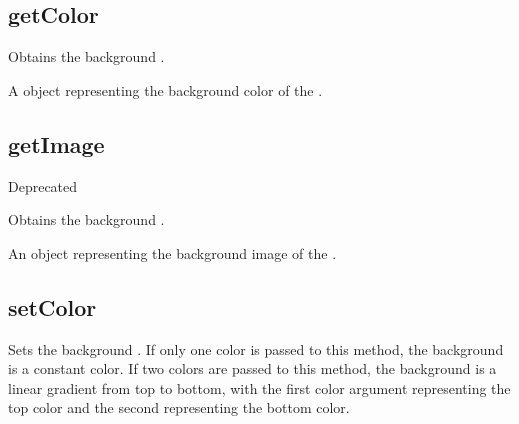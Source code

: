\documentclass[letterpaper,12pt,english,openany,oneside]{sphinxmanual}
\begin{document}
\label{\detokenize{JS_3D_API:properties-1}}


\subsection{getColor}
\label{\detokenize{JS_3D_API:getcolor}}
Obtains the background .


\begin{sphinxVerbatim}[commandchars=\\\{\}]
\end{sphinxVerbatim}


A  object representing the background color of the .


\subsection{getImage}
\label{\detokenize{JS_3D_API:getimage}}
Deprecated

Obtains the background .

\label{\detokenize{JS_3D_API:syntax-1}}

\begin{sphinxVerbatim}[commandchars=\\\{\}]
\end{sphinxVerbatim}
\label{\detokenize{JS_3D_API:returns-1}}

An  object representing the background image of the .


\subsection{setColor}
\label{\detokenize{JS_3D_API:setcolor}}
Sets the background . If only one color is passed to this method, the background is a constant color. If two colors are passed to this method, the background is a linear gradient from top to bottom, with the first color argument representing the top color and the second representing the bottom color.
\end{document}
